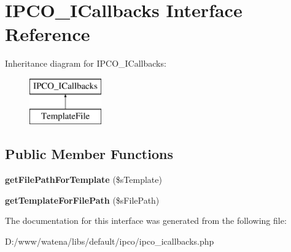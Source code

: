 \hypertarget{interface_i_p_c_o___i_callbacks}{\section{I\-P\-C\-O\-\_\-\-I\-Callbacks Interface Reference}
\label{interface_i_p_c_o___i_callbacks}
}
Inheritance diagram for I\-P\-C\-O\-\_\-\-I\-Callbacks\-:\begin{figure}[H]
\begin{center}
\leavevmode
\includegraphics[height=2.000000cm]{interface_i_p_c_o___i_callbacks}
\end{center}
\end{figure}
\subsection*{Public Member Functions}
\begin{DoxyCompactItemize}
\item 
\hypertarget{interface_i_p_c_o___i_callbacks_a2397c800443d42440a7961a9de65001f}{{\bfseries get\-File\-Path\-For\-Template} (\$s\-Template)}\label{interface_i_p_c_o___i_callbacks_a2397c800443d42440a7961a9de65001f}

\item 
\hypertarget{interface_i_p_c_o___i_callbacks_ae140a7ddcaa9ab61087b6655cd04f575}{{\bfseries get\-Template\-For\-File\-Path} (\$s\-File\-Path)}\label{interface_i_p_c_o___i_callbacks_ae140a7ddcaa9ab61087b6655cd04f575}

\end{DoxyCompactItemize}


The documentation for this interface was generated from the following file\-:\begin{DoxyCompactItemize}
\item 
D\-:/www/watena/libs/default/ipco/ipco\-\_\-icallbacks.\-php\end{DoxyCompactItemize}
